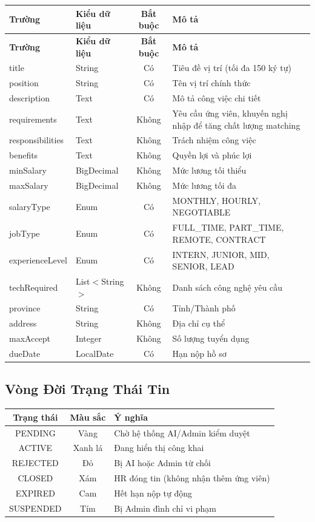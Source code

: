 \documentclass[12pt, a4paper]{report}
\begin{document}
\begin{longtable}{|p{4cm}|p{2.5cm}|c|p{5cm}|}
\hline
\textbf{Trường} & \textbf{Kiểu dữ liệu} & \textbf{Bắt buộc} & \textbf{Mô tả} \\
\hline
\endfirsthead
\hline
\textbf{Trường} & \textbf{Kiểu dữ liệu} & \textbf{Bắt buộc} & \textbf{Mô tả} \\
\hline
\endhead
title & String & Có & Tiêu đề vị trí (tối đa 150 ký tự) \\
\hline
position & String & Có & Tên vị trí chính thức \\
\hline
description & Text & Có & Mô tả công việc chi tiết \\
\hline
requirements & Text & Không & Yêu cầu ứng viên, khuyến nghị nhập để tăng chất lượng matching \\
\hline
responsibilities & Text & Không & Trách nhiệm công việc \\
\hline
benefits & Text & Không & Quyền lợi và phúc lợi \\
\hline
minSalary & BigDecimal & Không & Mức lương tối thiểu \\
\hline
maxSalary & BigDecimal & Không & Mức lương tối đa \\
\hline
salaryType & Enum & Có & MONTHLY, HOURLY, NEGOTIABLE \\
\hline
jobType & Enum & Có & FULL\_TIME, PART\_TIME, REMOTE, CONTRACT \\
\hline
experienceLevel & Enum & Có & INTERN, JUNIOR, MID, SENIOR, LEAD \\
\hline
techRequired & List$<$String$>$ & Không & Danh sách công nghệ yêu cầu \\
\hline
province & String & Có & Tỉnh/Thành phố \\
\hline
address & String & Không & Địa chỉ cụ thể \\
\hline
maxAccept & Integer & Không & Số lượng tuyển dụng \\
\hline
dueDate & LocalDate & Có & Hạn nộp hồ sơ \\
\hline
\end{longtable}

\subsection{Vòng Đời Trạng Thái Tin}

\begin{center}
\begin{tabular}{|c|c|p{7cm}|}
\hline
\textbf{Trạng thái} & \textbf{Màu sắc} & \textbf{Ý nghĩa} \\
\hline
PENDING & Vàng & Chờ hệ thống AI/Admin kiểm duyệt \\
\hline
ACTIVE & Xanh lá & Đang hiển thị công khai \\
\hline
REJECTED & Đỏ & Bị AI hoặc Admin từ chối \\
\hline
CLOSED & Xám & HR đóng tin (không nhận thêm ứng viên) \\
\hline
EXPIRED & Cam & Hết hạn nộp tự động \\
\hline
SUSPENDED & Tím & Bị Admin đình chỉ vi phạm \\
\hline
\end{tabular}
\end{center}
\end{document}
